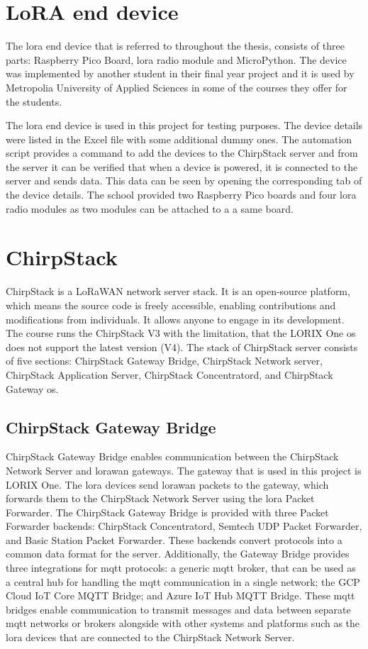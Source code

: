 \section{LoRA end device}
The \gls{lora} end device that is referred to throughout the thesis,  consists of three parts: Raspberry Pico Board, \gls{lora} radio module and MicroPython.
The device was implemented by another student in their final year project\cite{theseus:gere-zoltan} and it is used by Metropolia University of Applied Sciences in some of the courses they offer for the students.


The \gls{lora} end device is used in this project for testing purposes.
The device details were listed in the Excel file with some additional dummy ones.
The automation script provides a command to add the devices to the ChirpStack server and from the server it can be verified that when a device is powered, it is connected to the server and sends data.
This data can be seen by opening the corresponding tab of the device details.
The school provided two Raspberry Pico boards and four \gls{lora} radio modules as two modules can be attached to a a same board.


\section{ChirpStack}
ChirpStack is a LoRaWAN network server stack.
It is an open-source platform, which means the source code is freely accessible, enabling contributions and modifications from individuals. It allows anyone to engage in its development.
The course runs the ChirpStack V3 with the limitation, that the LORIX One \gls{os} does not support the latest version (V4).
The stack of ChirpStack server consists of five sections: ChirpStack Gateway Bridge, ChirpStack Network server, ChirpStack Application Server, ChirpStack Concentratord, and ChirpStack Gateway \gls{os}.

\subsection{ChirpStack Gateway Bridge}
ChirpStack Gateway Bridge enables communication between the ChirpStack Network Server and \gls{lorawan} gateways.
The gateway that is used in this project is LORIX One.
The \gls{lora} devices send \gls{lorawan} packets to the gateway, which forwards them to the ChirpStack Network Server using the \gls{lora} Packet Forwarder.
The ChirpStack Gateway Bridge is provided with three Packet Forwarder backends: ChirpStack Concentratord, Semtech UDP Packet Forwarder, and Basic Station Packet Forwarder.
These backends convert protocols into a common data format for the server.
Additionally, the Gateway Bridge provides three integrations for \gls{mqtt} protocols: a generic \gls{mqtt} broker, that can be used as a central hub for handling the \gls{mqtt} communication in a single network; the GCP Cloud IoT Core MQTT Bridge; and Azure IoT Hub MQTT Bridge.
These \gls{mqtt} bridges enable communication to transmit messages and data between separate \gls{mqtt} networks or brokers alongside with other systems and platforms such as the \gls{lora} devices that are connected to the ChirpStack Network Server.
\cite{chirpstack:gatewayBridge}

